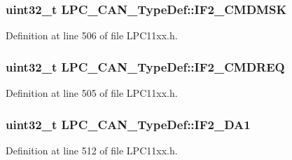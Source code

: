 \subsubsection[{\texorpdfstring{I\+F2\+\_\+\+C\+M\+D\+M\+SK}{IF2_CMDMSK}}]{ uint32\+\_\+t L\+P\+C\+\_\+\+C\+A\+N\+\_\+\+Type\+Def\+::\+I\+F2\+\_\+\+C\+M\+D\+M\+SK}\hypertarget{group___l_p_c11xx___definitions_gac1841a007c665765fd5bc9ec2c3bd9bb}{}\label{group___l_p_c11xx___definitions_gac1841a007c665765fd5bc9ec2c3bd9bb}


Definition at line 506 of file L\+P\+C11xx.\+h.

\subsubsection[{\texorpdfstring{I\+F2\+\_\+\+C\+M\+D\+R\+EQ}{IF2_CMDREQ}}]{ uint32\+\_\+t L\+P\+C\+\_\+\+C\+A\+N\+\_\+\+Type\+Def\+::\+I\+F2\+\_\+\+C\+M\+D\+R\+EQ}\hypertarget{group___l_p_c11xx___definitions_ga23eb87edb95f06094e7fdc2b00542fdb}{}\label{group___l_p_c11xx___definitions_ga23eb87edb95f06094e7fdc2b00542fdb}


Definition at line 505 of file L\+P\+C11xx.\+h.

\subsubsection[{\texorpdfstring{I\+F2\+\_\+\+D\+A1}{IF2_DA1}}]{ uint32\+\_\+t L\+P\+C\+\_\+\+C\+A\+N\+\_\+\+Type\+Def\+::\+I\+F2\+\_\+\+D\+A1}\hypertarget{group___l_p_c11xx___definitions_gafb6089f5fac0b908d26b073c05ae099e}{}\label{group___l_p_c11xx___definitions_gafb6089f5fac0b908d26b073c05ae099e}


Definition at line 512 of file L\+P\+C11xx.\+h.

